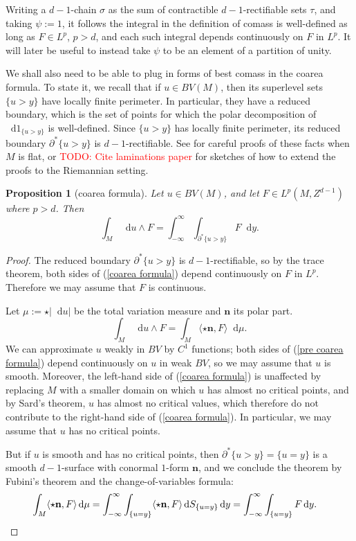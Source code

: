 \documentclass[reqno,11pt]{amsart}
\newcommand*\dif{\mathop{}\!\mathrm{d}}
\newcommand{\normal}{\mathbf n}
\newtheorem{proposition}[theorem]{Proposition}
\theoremstyle{definition}
\numberwithin{equation}{section}
\newcommand\todo[1]{\textcolor{red}{TODO: #1}}
\begin{document}
Writing a $d-1$-chain $\sigma$ as the sum of contractible $d-1$-rectifiable sets $\tau$, and taking $\psi := 1$, it follows the integral in the definition of comass is well-defined as long as $F \in L^p$, $p > d$, and each such integral depends continuously on $F$ in $L^p$.
It will later be useful to instead take $\psi$ to be an element of a partition of unity.

We shall also need to be able to plug in forms of best comass in the coarea formula.
To state it, we recall that if $u \in BV(M)$, then its superlevel sets $\{u > y\}$ have locally finite perimeter.
In particular, they have a reduced boundary, which is the set of points for which the polar decomposition of $\dif 1_{\{u > y\}}$ is well-defined.
Since $\{u > y\}$ has locally finite perimeter, its reduced boundary $\partial^* \{u > y\}$ is $d-1$-rectifiable.
See \cite[Chapters 1-4]{Giusti77} for careful proofs of these facts when $M$ is flat, or \todo{Cite laminations paper} for sketches of how to extend the proofs to the Riemannian setting.

\begin{proposition}[coarea formula]
Let $u \in BV(M)$, and let $F \in L^p(M, Z^{d - 1})$ where $p > d$. Then 
\begin{equation}\label{coarea formula}
\int_M \dif u \wedge F = \int_{-\infty}^\infty \int_{\partial^* \{u > y\}} F \dif y.
\end{equation}
\end{proposition}
\begin{proof}
The reduced boundary $\partial^* \{u > y\}$ is $d-1$-rectifiable, so by the trace theorem, both sides of (\ref{coarea formula}) depend continuously on $F$ in $L^p$.
Therefore we may assume that $F$ is continuous.

Let $\mu := \star |\dif u|$ be the total variation measure and $\normal$ its polar part.
\begin{equation}\label{pre coarea formula}
\int_M \dif u \wedge F = \int_M \langle \star \normal, F\rangle \dif \mu.
\end{equation}
We can approximate $u$ weakly in $BV$ by $C^1$ functions; both sides of (\ref{pre coarea formula}) depend continuously on $u$ in weak $BV$, so we may assume that $u$ is smooth.
Moreover, the left-hand side of (\ref{coarea formula}) is unaffected by replacing $M$ with a smaller domain on which $u$ has almost no critical points, and by Sard's theorem, $u$ has almost no critical values, which therefore do not contribute to the right-hand side of (\ref{coarea formula}).
In particular, we may assume that $u$ has no critical points.

But if $u$ is smooth and has no critical points, then $\partial^* \{u > y\} = \{u = y\}$ is a smooth $d-1$-surface with conormal $1$-form $\normal$, and we conclude the theorem by Fubini's theorem and the change-of-variables formula:
\begin{align*}
\int_M \langle \star \normal, F\rangle \dif \mu
&= \int_{-\infty}^\infty \int_{\{u = y\}} \langle \star \normal, F\rangle \dif S_{\{u = y\}} \dif y
= \int_{-\infty}^\infty \int_{\{u = y\}} F \dif y. \qedhere
\end{align*}
\end{proof}
\end{document}
